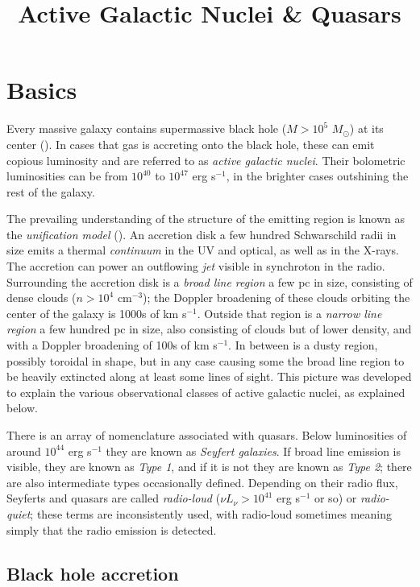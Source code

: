 \title{\bf Active Galactic Nuclei \& Quasars}

\section{Basics}

Every massive galaxy contains supermassive black hole ($M> 10^5$
$M_\odot$) at its center (\citealt{kormendy13a}). In cases that gas is
accreting onto the black hole, these can emit copious luminosity and
are referred to as {\it active galactic nuclei}. Their bolometric
luminosities can be from $10^{40}$ to $10^{47}$ erg s$^{-1}$, in the
brighter cases outshining the rest of the galaxy.

The prevailing understanding of the structure of the emitting region
is known as the {\it unification model} (\citealt{antonucci93a,
netzer15a}). An accretion disk a few hundred Schwarschild radii in
size emits a thermal {\it continuum} in the UV and optical, as well as
in the X-rays. The accretion can power an outflowing {\it jet} visible
in synchroton in the radio. Surrounding the accretion disk is a {\it
broad line region} a few pc in size, consisting of dense clouds
($n>10^4$ cm$^{-3}$); the Doppler broadening of these clouds orbiting
the center of the galaxy is 1000s of km s$^{-1}$. Outside that region
is a {\it narrow line region} a few hundred pc in size, also
consisting of clouds but of lower density, and with a Doppler
broadening of 100s of km s$^{-1}$. In between is a dusty region,
possibly toroidal in shape, but in any case causing some the broad
line region to be heavily extincted along at least some lines of
sight. This picture was developed to explain the various observational
classes of active galactic nuclei, as explained below.

There is an array of nomenclature associated with quasars. Below
luminosities of around $10^{44}$ erg s$^{-1}$ they are known as {\it
Seyfert galaxies}. If broad line emission is visible, they are known
as {\it Type 1}, and if it is not they are known as {\it Type 2};
there are also intermediate types occasionally defined. Depending on
their radio flux, Seyferts and quasars are called {\it radio-loud}
($\nu L_\nu > 10^{41}$ erg s$^{-1}$ or so) or {\it radio-quiet}; these
terms are inconsistently used, with radio-loud sometimes meaning
simply that the radio emission is detected.

\subsection{Black hole accretion}

